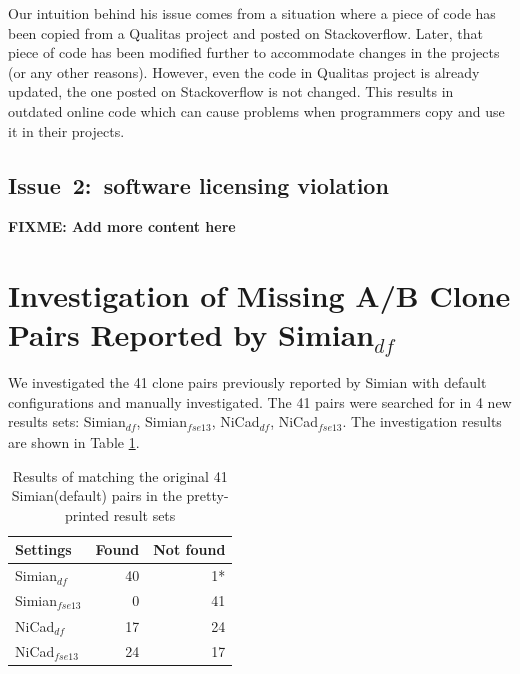 \documentclass{sig-alternate-05-2015}
\newcommand\FIXME[1]{\textbf{FIXME: #1}}
\begin{document}
Our intuition behind his issue comes from a situation where a piece of code has been copied from a Qualitas project and posted on Stackoverflow. Later, that piece of code has been modified further to accommodate changes in the projects (or any other reasons). However, even the code in Qualitas project is already updated, the one posted on Stackoverflow is not changed. This results in outdated online code which can cause problems when programmers copy and use it in their projects.

\subsection{Issue~2:~software licensing violation}
\FIXME{Add more content here}

\section{Investigation of Missing A/B Clone Pairs Reported by Simian$_{df}$}
We investigated the 41 clone pairs previously reported by Simian with default configurations and manually investigated. The 41 pairs were searched for in 4 new results sets: Simian$_{df}$, Simian$_{\mathrm{\textit{fse13}}}$, NiCad$_{df}$, NiCad$_{\mathrm{\textit{fse13}}}$. The investigation results are shown in Table \ref{tab:search}.

\begin{table}
	\centering
	\caption{Results of matching the original 41 Simian(default) pairs in the pretty-printed result sets}
	\label{tab:search}
	\begin{tabular}{l|r|r}
		\hline 
		Settings & Found & Not found \\ 
		\hline 
		Simian$_{df}$  &  40 & 1* \\ 
		\hline 
		Simian$_{\mathrm{\textit{fse13}}}$ & 0 & 41  \\ 
		\hline 
		NiCad$_{df}$  & 17 & 24 \\ 
		\hline 
		NiCad$_{\mathrm{\textit{fse13}}}$ &  24 & 17 \\ 
		\hline 
	\end{tabular} 
\end{table}
\end{document}

